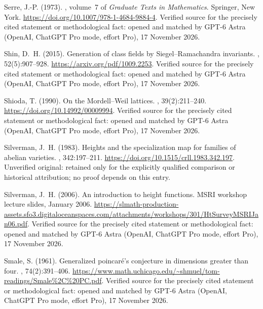 \begin{thebibliography}{}
Serre, J.-P. (1973).
, volume~7 of {\em Graduate Texts in
  Mathematics}.
\newblock Springer, New York.
\newblock \url{https://doi.org/10.1007/978-1-4684-9884-4}. Verified source for the precisely cited statement or methodological fact: opened and matched by GPT-6 Astra (OpenAI, ChatGPT Pro mode, effort Pro), 17 November 2026.

Shin, D.~H. (2015).
\newblock Generation of class fields by {Siegel--Ramachandra} invariants.
, 52(5):907--928.
\newblock \url{https://arxiv.org/pdf/1009.2253}. Verified source for the precisely cited statement or methodological fact: opened and matched by GPT-6 Astra (OpenAI, ChatGPT Pro mode, effort Pro), 17 November 2026.

Shioda, T. (1990).
\newblock On the {M}ordell--{W}eil lattices.
,
  39(2):211--240.
\newblock \url{https://doi.org/10.14992/00009994}. Verified source for the precisely cited statement or methodological fact: opened and matched by GPT-6 Astra (OpenAI, ChatGPT Pro mode, effort Pro), 17 November 2026.

Silverman, J.~H. (1983).
\newblock Heights and the specialization map for families of abelian varieties.
,
  342:197--211.
\newblock \url{https://doi.org/10.1515/crll.1983.342.197}. Unverified original: retained only for the explicitly qualified comparison or historical attribution; no proof depends on this entry.

Silverman, J.~H. (2006).
\newblock An introduction to height functions.
\newblock MSRI workshop lecture slides, January 2006.
\newblock \url{https://slmath-production-assets.sfo3.digitaloceanspaces.com/attachments/workshops/301/HtSurveyMSRIJan06.pdf}. Verified source for the precisely cited statement or methodological fact: opened and matched by GPT-6 Astra (OpenAI, ChatGPT Pro mode, effort Pro), 17 November 2026.

Smale, S. (1961).
\newblock Generalized poincar{\'e}'s conjecture in dimensions greater than
  four.
, 74(2):391--406.
\newblock \url{https://www.math.uchicago.edu/~shmuel/tom-readings/Smale%2C%20PC.pdf}. Verified source for the precisely cited statement or methodological fact: opened and matched by GPT-6 Astra (OpenAI, ChatGPT Pro mode, effort Pro), 17 November 2026.


\end{thebibliography}

